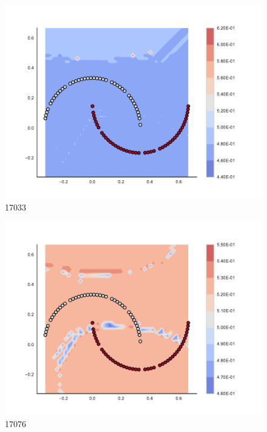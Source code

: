 \begin{subfigure}[b]{0.12\textwidth}
    \includegraphics[clip, trim=2.35cm 1.75cm 4.5cm 0cm,width=\textwidth]{img/convergence/17033.pdf}
    \caption{17033}
    \label{fig:convergence_17033}
\end{subfigure}
%
\begin{subfigure}[b]{0.12\textwidth}
    \includegraphics[clip, trim=2.35cm 1.75cm 4.5cm 0cm,width=\textwidth]{img/convergence/17076.pdf}
    \caption{17076}
    \label{fig:convergence_17076}
\end{subfigure}
%